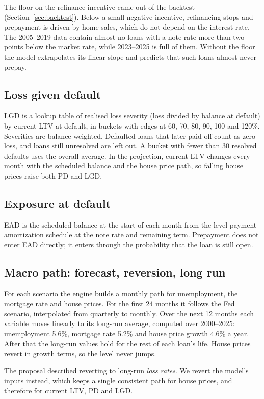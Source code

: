 \documentclass[11pt]{article}
\begin{document}
The floor on the refinance incentive came out of the backtest (Section~\ref{sec:backtest}). Below a small negative
incentive, refinancing stops and prepayment is driven by home sales, which do not depend on the interest rate. The
2005--2019 data contain almost no loans with a note rate more than two points below the market rate, while
2023--2025 is full of them. Without the floor the model extrapolates its linear slope and predicts that such loans
almost never prepay.

\subsection{Loss given default}
LGD is a lookup table of realised loss severity (loss divided by balance at default) by current LTV at default, in
buckets with edges at 60, 70, 80, 90, 100 and 120\%. Severities are balance-weighted. Defaulted loans that later
paid off count as zero loss, and loans still unresolved are left out. A bucket with fewer than 30 resolved defaults
uses the overall average. In the projection, current LTV changes every month with the scheduled balance and the
house price path, so falling house prices raise both PD and LGD.

\subsection{Exposure at default}
EAD is the scheduled balance at the start of each month from the level-payment amortization schedule at the note
rate and remaining term. Prepayment does not enter EAD directly; it enters through the probability that the loan is
still open.

\subsection{Macro path: forecast, reversion, long run}
For each scenario the engine builds a monthly path for unemployment, the mortgage rate and house prices. For the
first 24 months it follows the Fed scenario, interpolated from quarterly to monthly. Over the next 12 months each
variable moves linearly to its long-run average, computed over 2000--2025: unemployment 5.6\%, mortgage rate 5.2\%
and house price growth 4.6\% a year. After that the long-run values hold for the rest of each loan's life. House
prices revert in growth terms, so the level never jumps.

The proposal described reverting to long-run \emph{loss rates}. We revert the model's inputs instead, which keeps a
single consistent path for house prices, and therefore for current LTV, PD and LGD.
\end{document}
